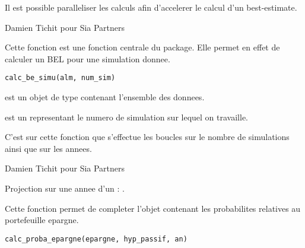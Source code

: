 \documentclass[a4paper]{book}
\begin{document}
%
\begin{Details}\relax
Il est possible paralleliser les calculs afin d'accelerer le calcul d'un best-estimate.
\end{Details}
%
\begin{Author}\relax
Damien Tichit pour Sia Partners
\end{Author}
%
\begin{Description}\relax
Cette fonction est une fonction centrale du package. Elle permet en effet de calculer un BEL pour une simulation donnee.
\end{Description}
%
\begin{Usage}
\begin{verbatim}
calc_be_simu(alm, num_sim)
\end{verbatim}
\end{Usage}
%
\begin{Arguments}
\begin{ldescription}
\item[\code{alm}] est un objet de type  contenant l'ensemble des donnees.

\item[\code{num\_sim}] est un  representant le numero de simulation sur lequel on travaille.
\end{ldescription}
\end{Arguments}
%
\begin{Details}\relax
C'est sur cette fonction que s'effectue les boucles sur le nombre de simulations ainsi que sur les annees.
\end{Details}
%
\begin{Author}\relax
Damien Tichit pour Sia Partners
\end{Author}
%
\begin{SeeAlso}\relax
Projection sur une annee d'un  : .
\end{SeeAlso}
%
\begin{Description}\relax
Cette fonction permet de completer l'objet contenant les probabilites relatives au portefeuille epargne.
\end{Description}
%
\begin{Usage}
\begin{verbatim}
calc_proba_epargne(epargne, hyp_passif, an)
\end{verbatim}
\end{Usage}
\end{document}
